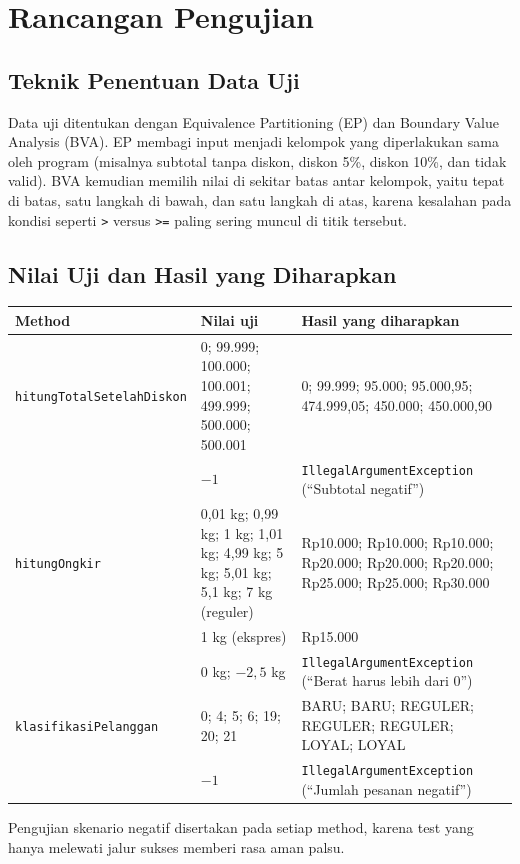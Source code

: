 \documentclass[11pt,a4paper]{article}
\newcommand{\hrow}{\rowcolor{headrow}}
\begin{document}
\section{Rancangan Pengujian}

\subsection{Teknik Penentuan Data Uji}
Data uji ditentukan dengan Equivalence Partitioning (EP) dan Boundary Value Analysis (BVA). EP membagi input menjadi kelompok yang diperlakukan sama oleh program (misalnya subtotal tanpa diskon, diskon 5\%, diskon 10\%, dan tidak valid). BVA kemudian memilih nilai di sekitar batas antar kelompok, yaitu tepat di batas, satu langkah di bawah, dan satu langkah di atas, karena kesalahan pada kondisi seperti \texttt{>} versus \texttt{>=} paling sering muncul di titik tersebut.

\subsection{Nilai Uji dan Hasil yang Diharapkan}
\begin{center}
\begin{tabularx}{\textwidth}{@{}P{3.4cm}P{5.0cm}Y@{}}
\toprule
\hrow \textbf{Method} & \textbf{Nilai uji} & \textbf{Hasil yang diharapkan} \\
\midrule
\texttt{hitung\allowbreak Total\allowbreak Setelah\allowbreak Diskon} & 0; 99.999; 100.000; 100.001; 499.999; 500.000; 500.001 & 0; 99.999; 95.000; 95.000,95; 474.999,05; 450.000; 450.000,90 \\
 & $-1$ & \texttt{IllegalArgumentException} (``Subtotal negatif'') \\
\addlinespace
\texttt{hitungOngkir} & 0,01 kg; 0,99 kg; 1 kg; 1,01 kg; 4,99 kg; 5 kg; 5,01 kg; 5,1 kg; 7 kg (reguler) & Rp10.000; Rp10.000; Rp10.000; Rp20.000; Rp20.000; Rp20.000; Rp25.000; Rp25.000; Rp30.000 \\
 & 1 kg (ekspres) & Rp15.000 \\
 & 0 kg; $-2{,}5$ kg & \texttt{IllegalArgumentException} (``Berat harus lebih dari 0'') \\
\addlinespace
\texttt{klasifikasi\allowbreak Pelanggan} & 0; 4; 5; 6; 19; 20; 21 & BARU; BARU; REGULER; REGULER; REGULER; LOYAL; LOYAL \\
 & $-1$ & \texttt{IllegalArgumentException} (``Jumlah pesanan negatif'') \\
\bottomrule
\end{tabularx}
\end{center}
Pengujian skenario negatif disertakan pada setiap method, karena test yang hanya melewati jalur sukses memberi rasa aman palsu.
\end{document}
